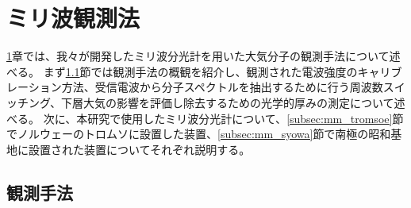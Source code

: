 \chapter{ミリ波観測法}
\label{ch:mm_obs}
\ref{ch:mm_obs}章では、我々が開発したミリ波分光計を用いた大気分子の観測手法について述べる。
まず\ref{sec:mm_obs}節では観測手法の概観を紹介し、観測された電波強度のキャリブレーション方法、受信電波から分子スペクトルを抽出するために行う周波数スイッチング、下層大気の影響を評価し除去するための光学的厚みの測定について述べる。
次に、本研究で使用したミリ波分光計について、\ref{subsec:mm_tromsoe}節でノルウェーのトロムソに設置した装置、\ref{subsec:mm_syowa}節で南極の昭和基地に設置された装置についてそれぞれ説明する。


\section{観測手法}
\label{sec:mm_obs}
